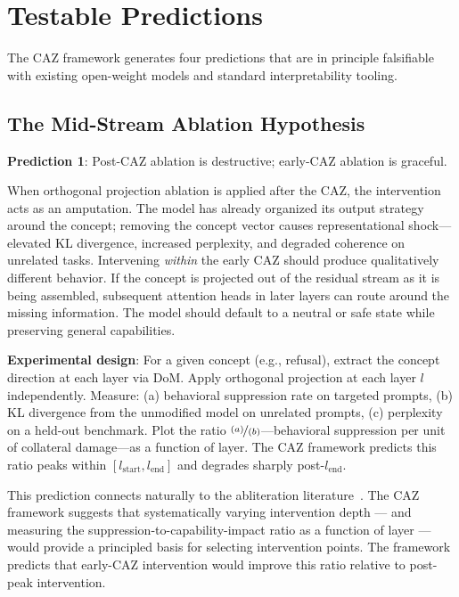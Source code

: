 \documentclass[11pt,a4paper]{article}
\begin{document}
\section{Testable Predictions}
\label{sec:predictions}

The CAZ framework generates four predictions that are in principle falsifiable with
existing open-weight models and standard interpretability tooling.

\subsection{The Mid-Stream Ablation Hypothesis}

\textbf{Prediction 1}: Post-CAZ ablation is destructive; early-CAZ ablation is
graceful.

When orthogonal projection ablation is applied after the CAZ, the intervention acts
as an amputation. The model has already organized its output strategy around the
concept; removing the concept vector causes representational shock---elevated KL
divergence, increased perplexity, and degraded coherence on unrelated tasks.
Intervening \emph{within} the early CAZ should produce qualitatively different
behavior. If the concept is projected out of the residual stream as it is being
assembled, subsequent attention heads in later layers can route around the missing
information. The model should default to a neutral or safe state while preserving
general capabilities.

\textbf{Experimental design}: For a given concept (e.g., refusal), extract the
concept direction at each layer via DoM. Apply orthogonal projection at each layer
$l$ independently. Measure: (a) behavioral suppression rate on targeted prompts,
(b) KL divergence from the unmodified model on unrelated prompts, (c) perplexity
on a held-out benchmark. Plot the ratio $\nicefrac{(a)}{(b)}$---behavioral suppression
per unit of collateral damage---as a function of layer. The CAZ framework predicts
this ratio peaks within $[l_\text{start}, l_\text{end}]$ and degrades sharply
post-$l_\text{end}$.

This prediction connects naturally to the abliteration literature~\citep{arditi2024refusal}.
The CAZ framework suggests that systematically varying intervention depth --- and
measuring the suppression-to-capability-impact ratio as a function of layer --- would
provide a principled basis for selecting intervention points. The framework predicts
that early-CAZ intervention would improve this ratio relative to post-peak intervention.
\end{document}
